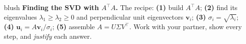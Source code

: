 \documentclass[10pt]{article}
\newcommand{\uu}{\mathbf{u}}
\newcommand{\vv}{\mathbf{v}}
\newcommand{\T}{^{\top}}
\begin{document}
\namepartnerperiod

\vspace{0.10in}

\begin{headlinebox}{blush}
\small\textbf{Finding the SVD with $A\T A$.} The recipe: \textbf{(1)} build $A\T A$; \textbf{(2)} find its
eigenvalues $\lambda_1\ge\lambda_2\ge0$ and perpendicular unit eigenvectors $\vv_i$; \textbf{(3)}
$\sigma_i=\sqrt{\lambda_i}$; \textbf{(4)} $\uu_i=A\vv_i/\sigma_i$; \textbf{(5)} assemble $A=U\Sigma V\T$.
Work with your partner, show every step, and \emph{justify} each answer.
\end{headlinebox}

\vspace{0.10in}
\end{document}

